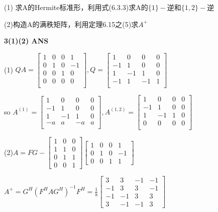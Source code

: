 \documentclass[11pt,letterpaper]{ctexart}
\begin{document}
\begin{enumerate}
(1) 求A的Hermite标准形，利用式(6.3.3)求A的$\{1\}-$逆和$\{1,2\}-$逆

(2)构造A的满秩矩阵，利用定理6.15之(5)求$A^{+}$

\textbf{3(1)(2) ANS}
\bigskip

(1) $QA = \begin{bmatrix}
	1 & 0 & 0 & 1 \\
	0 & 1 & 0 & -1 \\
	0 & 0 & 1 & 0 \\
	0 & 0 & 0 & 0 \\
\end{bmatrix}, Q = \begin{bmatrix}
	1 & 0 & 0 & 0 \\
	-1 & 1 & 0 & 0 \\
	1 & -1 & 1 & 0 \\
	-1 & 1 & -1 & 1 \\
\end{bmatrix}$

so $A^{(1)} = \begin{bmatrix}
	1 & 0 & 0 & 0 \\
	-1 & 1 & 0 & 0 \\
	1 & -1 & 1 & 0 \\
	-a & a & -a & a \\
\end{bmatrix}, A^{(1, 2)} = \begin{bmatrix}
	1 & 0 & 0 & 0 \\
	-1 & 1 & 0 & 0 \\
	1 & -1 & 1 & 0 \\
	0 & 0 & 0 & 0 \\
\end{bmatrix}$


(2)$A = FG - \begin{bmatrix}
	1 & 0 & 0 \\
	1 & 1 & 0 \\
	0 & 1 & 1 \\
	0 & 0 & 1 
\end{bmatrix}\begin{bmatrix}
	1 & 0 & 0 & 1 \\
	0 & 1 & 0 & -1 \\
	0 & 0 & 1 & 1
\end{bmatrix}$

$A^{+} = G^H(F^{H}AG^{H})^{-1}F^H = \frac{1}{8}\begin{bmatrix}
	3 & 3 & -1 & -1 \\
	-1 & 3 & 3 & -1 \\
	-1 & -1 & 3 & 3 \\
	3 & -1 & -1 & 3 
\end{bmatrix}$



\end{enumerate}
\end{document}
